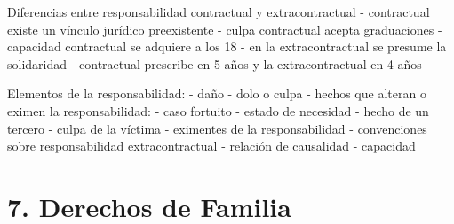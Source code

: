 \documentclass[]{article}
\begin{document}
Diferencias entre responsabilidad contractual y extracontractual -
contractual existe un vínculo jurídico preexistente - culpa contractual
acepta graduaciones - capacidad contractual se adquiere a los 18 - en la
extracontractual se presume la solidaridad - contractual prescribe en 5
años y la extracontractual en 4 años

Elementos de la responsabilidad: - daño - dolo o culpa - hechos que
alteran o eximen la responsabilidad: - caso fortuito - estado de
necesidad - hecho de un tercero - culpa de la víctima - eximentes de la
responsabilidad - convenciones sobre responsabilidad extracontractual -
relación de causalidad - capacidad

\hypertarget{derechos-de-familia}{%
\section{7. Derechos de Familia}\label{derechos-de-familia}}
\end{document}
